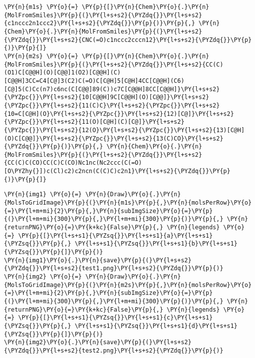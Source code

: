     \begin{tcolorbox}[breakable, size=fbox, boxrule=1pt, pad at break*=1mm,colback=cellbackground, colframe=cellborder]
\begin{Verbatim}[commandchars=\\\{\}]
\PY{n}{m1s} \PY{o}{=} \PY{p}{[}\PY{n}{Chem}\PY{o}{.}\PY{n}{MolFromSmiles}\PY{p}{(}\PY{l+s+s2}{\PYZdq{}}\PY{l+s+s2}{c1nccc2n1ccc2}\PY{l+s+s2}{\PYZdq{}}\PY{p}{)}\PY{p}{,} \PY{n}{Chem}\PY{o}{.}\PY{n}{MolFromSmiles}\PY{p}{(}\PY{l+s+s2}{\PYZdq{}}\PY{l+s+s2}{CNC(=O)c1nccc2cccn12}\PY{l+s+s2}{\PYZdq{}}\PY{p}{)}\PY{p}{]}
\PY{n}{m2s} \PY{o}{=} \PY{p}{[}\PY{n}{Chem}\PY{o}{.}\PY{n}{MolFromSmiles}\PY{p}{(}\PY{l+s+s2}{\PYZdq{}}\PY{l+s+s2}{CC(C)(O1)C[C@@H](O)[C@@]1(O2)[C@@H](C)[C@@H]3CC=C4[C@]3(C2)C(=O)C[C@H]5[C@H]4CC[C@@H](C6)[C@]5(C)Cc(n7)c6nc(C[C@@]89(C))c7C[C@@H]8CC[C@@H]}\PY{l+s+s2}{\PYZpc{}}\PY{l+s+s2}{10[C@@H]9C[C@@H](O)[C@@]}\PY{l+s+s2}{\PYZpc{}}\PY{l+s+s2}{11(C)C}\PY{l+s+s2}{\PYZpc{}}\PY{l+s+s2}{10=C[C@H](O}\PY{l+s+s2}{\PYZpc{}}\PY{l+s+s2}{12)[C@]}\PY{l+s+s2}{\PYZpc{}}\PY{l+s+s2}{11(O)[C@H](C)[C@]}\PY{l+s+s2}{\PYZpc{}}\PY{l+s+s2}{12(O}\PY{l+s+s2}{\PYZpc{}}\PY{l+s+s2}{13)[C@H](O)C[C@@]}\PY{l+s+s2}{\PYZpc{}}\PY{l+s+s2}{13(C)CO}\PY{l+s+s2}{\PYZdq{}}\PY{p}{)}\PY{p}{,} \PY{n}{Chem}\PY{o}{.}\PY{n}{MolFromSmiles}\PY{p}{(}\PY{l+s+s2}{\PYZdq{}}\PY{l+s+s2}{CC(C)C(CO)CC(C)C(CO)Nc1nc(Nc2ccc(C(=O)[O\PYZhy{}])c(Cl)c2)c2ncn(C(C)C)c2n1}\PY{l+s+s2}{\PYZdq{}}\PY{p}{)}\PY{p}{]}
\end{Verbatim}
\end{tcolorbox}

    \begin{tcolorbox}[breakable, size=fbox, boxrule=1pt, pad at break*=1mm,colback=cellbackground, colframe=cellborder]
\begin{Verbatim}[commandchars=\\\{\}]
\PY{n}{img1} \PY{o}{=} \PY{n}{Draw}\PY{o}{.}\PY{n}{MolsToGridImage}\PY{p}{(}\PY{n}{m1s}\PY{p}{,}\PY{n}{molsPerRow}\PY{o}{=}\PY{l+m+mi}{2}\PY{p}{,}\PY{n}{subImgSize}\PY{o}{=}\PY{p}{(}\PY{l+m+mi}{300}\PY{p}{,}\PY{l+m+mi}{300}\PY{p}{)}\PY{p}{,} \PY{n}{returnPNG}\PY{o}{=}\PY{k+kc}{False}\PY{p}{,} \PY{n}{legends} \PY{o}{=} \PY{p}{[}\PY{l+s+s1}{\PYZsq{}}\PY{l+s+s1}{a}\PY{l+s+s1}{\PYZsq{}}\PY{p}{,} \PY{l+s+s1}{\PYZsq{}}\PY{l+s+s1}{b}\PY{l+s+s1}{\PYZsq{}}\PY{p}{]}\PY{p}{)}    
\PY{n}{img1}\PY{o}{.}\PY{n}{save}\PY{p}{(}\PY{l+s+s2}{\PYZdq{}}\PY{l+s+s2}{test1.png}\PY{l+s+s2}{\PYZdq{}}\PY{p}{)}
\PY{n}{img2} \PY{o}{=} \PY{n}{Draw}\PY{o}{.}\PY{n}{MolsToGridImage}\PY{p}{(}\PY{n}{m2s}\PY{p}{,}\PY{n}{molsPerRow}\PY{o}{=}\PY{l+m+mi}{2}\PY{p}{,}\PY{n}{subImgSize}\PY{o}{=}\PY{p}{(}\PY{l+m+mi}{300}\PY{p}{,}\PY{l+m+mi}{300}\PY{p}{)}\PY{p}{,} \PY{n}{returnPNG}\PY{o}{=}\PY{k+kc}{False}\PY{p}{,} \PY{n}{legends} \PY{o}{=} \PY{p}{[}\PY{l+s+s1}{\PYZsq{}}\PY{l+s+s1}{c}\PY{l+s+s1}{\PYZsq{}}\PY{p}{,} \PY{l+s+s1}{\PYZsq{}}\PY{l+s+s1}{d}\PY{l+s+s1}{\PYZsq{}}\PY{p}{]}\PY{p}{)}    
\PY{n}{img2}\PY{o}{.}\PY{n}{save}\PY{p}{(}\PY{l+s+s2}{\PYZdq{}}\PY{l+s+s2}{test2.png}\PY{l+s+s2}{\PYZdq{}}\PY{p}{)}
\end{Verbatim}
\end{tcolorbox}

